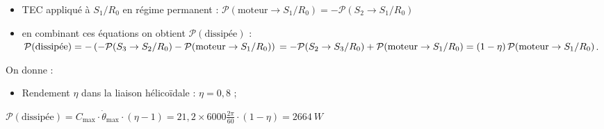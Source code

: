 \begin{multicols}{2}
\begin{corrige}
\begin{itemize}
\item TEC appliqué à $S_1/R_0$ en régime permanent :
$\mathcal{P}(\text{moteur}\to S_1/R_0)=-\mathcal{P}(S_2\to S_1/R_0)$
\item en combinant ces équations on obtient $\mathcal{P}(\text{dissipée})$ : 
$\mathcal{P}(\text{dissipée})=-\left(-\mathcal{P}(S_3\to S_2/R_0)-\mathcal{P}(\text{moteur}\to S_1/R_0)\right)\\
=-\mathcal{P}(S_2\to S_3/R_0)+\mathcal{P}(\text{moteur}\to S_1/R_0)=\left(1-\eta\right)\mathcal{P}(\text{moteur}\to S_1/R_0)$.
\end{itemize}
\end{corrige}\else\fi

\vspace{.5cm}
On donne : 
\begin{itemize}
\item Rendement $\eta$ dans la liaison hélicoïdale : $\eta=0,8$ ; 
\end{itemize}


\ifprof\begin{corrige}
$
\mathcal{P}(\text{dissipée})=C_{\text{max}}\cdot \dot{\theta}_{\text{max}}\cdot \left(\eta-1\right)
=21,2\times6000\frac{2\pi}{60}\cdot \left(1-\eta\right)=\SI{2664}{W}
$
\end{corrige}\else\fi




\ifprof
\else
\end{multicols}
\fi
